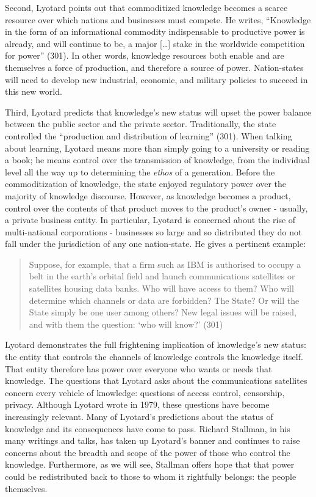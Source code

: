 \documentclass[titlepage]{article}
\begin{document}
Second, Lyotard points out that commoditized knowledge becomes a scarce
resource over which nations and businesses must compete. He writes,
``Knowledge in the form of an informational commodity indispensable to
productive power is already, and will continue to be, a major
{[}\ldots{}{]} stake in the worldwide competition for power'' (301). In
other words, knowledge resources both enable and are themselves a force
of production, and therefore a source of power. Nation-states will need
to develop new industrial, economic, and military policies to succeed in
this new world.

Third, Lyotard predicts that knowledge's new status will upset the power
balance between the public sector and the private sector. Traditionally,
the state controlled the ``production and distribution of learning''
(301). When talking about learning, Lyotard means more than simply going
to a university or reading a book; he means control over the
transmission of knowledge, from the individual level all the way up to
determining the \emph{ethos} of a generation. Before the commoditization
of knowledge, the state enjoyed regulatory power over the majority of
knowledge discourse. However, as knowledge becomes a product, control
over the contents of that product moves to the product's owner -
usually, a private business entity. In particular, Lyotard is concerned
about the rise of multi-national corporations - businesses so large and
so distributed they do not fall under the jurisdiction of any one
nation-state. He gives a pertinent example:

\begin{quote}
Suppose, for example, that a firm such as IBM is authorised to occupy a
belt in the earth's orbital field and launch communications satellites
or satellites housing data banks. Who will have access to them? Who will
determine which channels or data are forbidden? The State? Or will the
State simply be one user among others? New legal issues will be raised,
and with them the question: `who will know?' (301)
\end{quote}

Lyotard demonstrates the full frightening implication of knowledge's new
status: the entity that controls the channels of knowledge controls the
knowledge itself. That entity therefore has power over everyone who
wants or needs that knowledge. The questions that Lyotard asks about the
communications satellites concern every vehicle of knowledge: questions
of access control, censorship, privacy. Although Lyotard wrote in 1979,
these questions have become increasingly relevant. Many of Lyotard's
predictions about the status of knowledge and its consequences have come
to pass. Richard Stallman, in his many writings and talks, has taken up
Lyotard's banner and continues to raise concerns about the breadth and
scope of the power of those who control the knowledge. Furthermore, as
we will see, Stallman offers hope that that power could be redistributed
back to those to whom it rightfully belongs: the people themselves.
\end{document}
